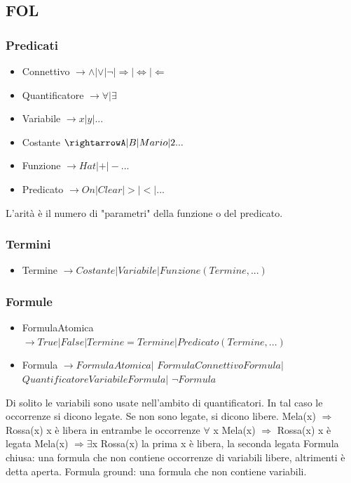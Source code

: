 \documentclass{article}
\begin{document}
\subsection{FOL}
\subsubsection{Predicati}
\begin{itemize}
    \item Connettivo $\rightarrow \land | \lor | \neg | \Rightarrow | \Leftrightarrow | \Leftarrow$
    \item Quantificatore $\rightarrow \forall | \exists $
    \item Variabile $\rightarrow x | y | ...$
    \item Costante $ \rightarrowA | B | Mario | 2 ...$
    \item Funzione $\rightarrow Hat | + | - ...$
    \item Predicato $\rightarrow On | Clear | > | < | ...$
\end{itemize}
L'arità è il numero di "parametri" della funzione o del predicato.
\subsubsection{Termini}
\begin{itemize}
    \item Termine $\rightarrow Costante | Variabile | Funzione(Termine,...)$
\end{itemize}
\subsubsection{Formule}
\begin{itemize}
    \item FormulaAtomica $ \rightarrow True | False | Termine=Termine | Predicato(Termine,...)$
    \item Formula $\rightarrow FormulaAtomica |$ $Formula Connettivo Formula |$ $Quantificatore Variabile Formula |$ $\neg Formula$
\end{itemize}
Di solito le variabili sono usate nell'ambito di quantificatori. In tal caso le occorrenze si dicono legate. Se non sono legate, si dicono libere. \newline
    Mela(x) $\Rightarrow$ Rossa(x) \quad x è libera in entrambe le occorrenze \newline
	$\forall$ x Mela(x) $\Rightarrow$ Rossa(x) \quad x è legata \newline
	Mela(x) $\Rightarrow \exists$x Rossa(x) \quad la prima x è libera, la seconda legata \newline
Formula chiusa: una formula che non contiene occorrenze di variabili libere, altrimenti è detta aperta.\newline
Formula ground: una formula che non contiene variabili.
\end{document}
